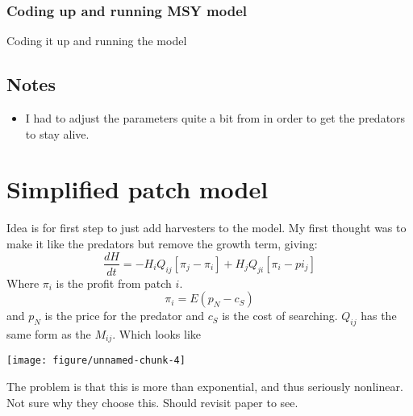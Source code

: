 \documentclass{article}\usepackage{graphicx, color}
\makeatletter
\def\maxwidth{ %
  \ifdim\Gin@nat@width>\linewidth
    \linewidth
  \else
    \Gin@nat@width
  \fi
}
\newenvironment{kframe}{%
 \def\at@end@of@kframe{}%
 \ifinner\ifhmode%
  \def\at@end@of@kframe{\end{minipage}}%
  \begin{minipage}{\columnwidth}%
 \fi\fi%
 \def\FrameCommand##1{\hskip\@totalleftmargin \hskip-\fboxsep
 \colorbox{shadecolor}{##1}\hskip-\fboxsep
     \hskip-\linewidth \hskip-\@totalleftmargin \hskip\columnwidth}%
 \MakeFramed {\advance\hsize-\width
   \@totalleftmargin\z@ \linewidth\hsize
   \@setminipage}}%
 {\par\unskip\endMakeFramed%
 \at@end@of@kframe}
\newenvironment{knitrout}{}{} %
\makeatother
\begin{document}
\subsubsection{Coding up and running MSY model}
Coding it up and running the model 
\begin{knitrout}
\color{fgcolor}\begin{kframe}


{\ttfamily\noindent\bfseries\color{errorcolor}{\#\# Error: could not find function "ode"}}

{\ttfamily\noindent\bfseries\color{errorcolor}{\#\# Error: object 'out' not found}}\end{kframe}
\end{knitrout}

\subsection{Notes}
\begin{itemize}
\item I had to adjust the parameters quite a bit from \cite{abramsetal:2012} in order to get the predators to stay alive.
\end{itemize}

\section{Simplified patch model}
Idea is for first step to just add harvesters to the \cite{abramsetal:2012} model. My first thought was to make it like the predators but remove the growth term, giving:
\[\frac{dH}{dt}= -H_iQ_{ij}[\pi_j-\pi_i]+H_jQ_{ji}[\pi_i-pi_j]\]
Where $\pi_i$ is the profit from patch $i$. 
\[\pi_i = E(p_N - c_S)\]
and $p_N$ is the price for the predator and $c_S$ is the cost of searching. $Q_{ij}$ has the same form as the \cite{abramsetal:2012} $M_{ij}$. Which looks like

\begin{knitrout}
\color{fgcolor}
\texttt{[image: figure/unnamed-chunk-4]} 

\end{knitrout}

The problem is that this is more than exponential, and thus seriously nonlinear. Not sure why they choose this. Should revisit paper to see. 



\end{document}
